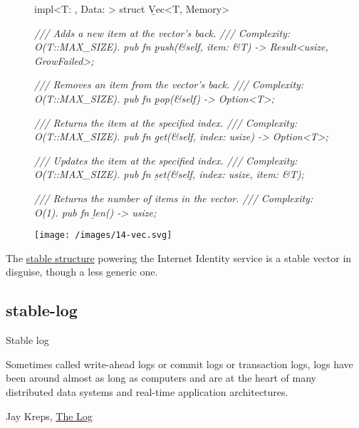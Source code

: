 \documentclass{article}
\begin{document}
\begin{figure}
\begin{code}[rust]
impl<T: \href{#storable-types}{}, Data: \href{#memory}{}> struct \b{Vec}<T, Memory> {
    \em{/// Adds a new item at the vector's back.}
    \em{/// Complexity: O(T::MAX_SIZE).}
    pub fn \b{push}(&self, item: &T) -> Result<usize, GrowFailed>;

    \em{/// Removes an item from the vector's back.}
    \em{/// Complexity: O(T::MAX_SIZE).}
    pub fn \b{pop}(&self) -> Option<T>;

    \em{/// Returns the item at the specified index.}
    \em{/// Complexity: O(T::MAX_SIZE).}
    pub fn \b{get}(&self, index: usize) -> Option<T>;

    \em{/// Updates the item at the specified index.}
    \em{/// Complexity: O(T::MAX_SIZE).}
    pub fn \b{set}(&self, index: usize, item: &T);

    \em{/// Returns the number of items in the vector.}
    \em{/// Complexity: O(1).}
    pub fn \b{len}() -> usize;
}
\end{code}
\end{figure}
\begin{figure}[grayscale-diagram]
  \texttt{[image: /images/14-vec.svg]}
\end{figure}

The \href{/posts/11-ii-stable-memory.html#ii-memory-layout}{stable structure} powering the Internet Identity service is a stable vector in disguise, though a less generic one.

\subsection{stable-log}{Stable log}
\epigraph{
  Sometimes called write-ahead logs or commit logs or transaction logs, logs have been around almost as long as computers and are at the heart of many distributed data systems and real-time application architectures.
}{Jay Kreps, \href{https://engineering.linkedin.com/distributed-systems/log-what-every-software-engineer-should-know-about-real-time-datas-unifying}{The Log}}
\end{document}
